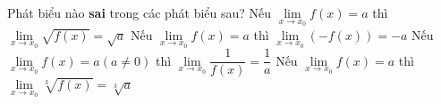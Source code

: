 	\begin{ex}%
		Phát biểu nào \textbf{ sai} trong các phát biểu sau?
		\choice
		{\True Nếu $\displaystyle\lim\limits_{x\to x_0}f(x)=a$ thì $\displaystyle\lim\limits_{x\to x_0}\sqrt{f(x)}=\sqrt{a}$}
		{Nếu $\displaystyle\lim\limits_{x\to x_0}f(x)=a$ thì $\displaystyle\lim\limits_{x\to x_0}\left(-f(x)\right)=-a$}
		{Nếu $\displaystyle\lim\limits_{x\to x_0}f(x)=a (a\ne 0)$ thì $\displaystyle\lim\limits_{x\to x_0}\dfrac{1}{f(x)}=\dfrac{1}{a}$ }
		{Nếu $\displaystyle\lim\limits_{x\to x_0}f(x)=a$ thì $\displaystyle\lim\limits_{x\to x_0}\sqrt[3]{f(x)}=\sqrt[3]{a}$}
	\end{ex}
	
